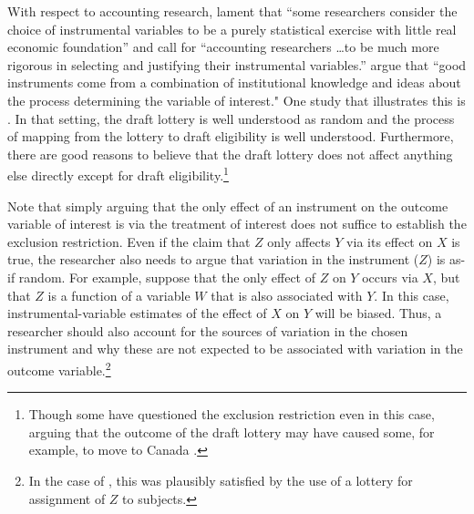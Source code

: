 \documentclass[12pt,reqno,titlepage]{amsart}
\theoremstyle{definition}
\begin{document}
\begin{doublespace}
With respect to accounting research, \citet{Larcker:2010fq} lament that ``some researchers consider the choice of instrumental variables to be a purely statistical exercise with little real economic foundation'' and call for 
``accounting researchers \dots to be much more rigorous in selecting and justifying their instrumental variables.'' 
\citet[p.117]{Angrist:2008vk} argue that ``good instruments come from a combination of institutional knowledge and ideas about the process determining the variable of interest."
One study that illustrates this is \citet{Angrist:1990dk}.
In that setting, the draft lottery is well understood as random and the process of mapping from the lottery to draft eligibility is well understood.
Furthermore, there are good reasons to believe that the draft lottery does not affect anything else directly except for draft eligibility.\footnote{Though some have questioned the exclusion restriction even in this case, arguing that the outcome of the draft lottery may have caused some, for example, to move to Canada \citep[see][]{Imbens:2015aa}.}

Note that simply arguing that the only effect of an instrument on the outcome variable of interest is via the treatment of interest does not suffice to establish the exclusion restriction.
Even if the claim that $Z$ only affects $Y$ via its effect on $X$ is true, the researcher also needs to argue that variation in the instrument ($Z$) is as-if random.
For example, suppose that the only effect of $Z$ on $Y$ occurs via $X$, but that $Z$ is a function of a variable $W$ that is also associated with $Y$. 
In this case, instrumental-variable estimates of the effect of $X$ on $Y$ will be biased.
Thus, a researcher should also account for the sources of variation in the chosen instrument and why these are not expected to be associated with  variation in the outcome variable.\footnote{
In the case of \citet{Angrist:1990dk}, this was plausibly satisfied by the use of a lottery for assignment of $Z$ to subjects.}



\end{doublespace}
\end{document}
